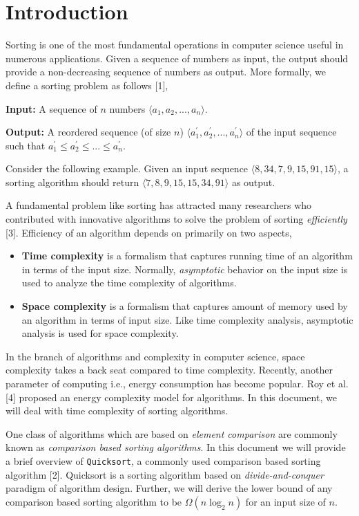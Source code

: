 \documentclass[a4paper, 10pt,twocolumn]{article}
\begin{document}
\section{Introduction}
Sorting is one of the most fundamental operations in computer science useful in numerous applications. Given a sequence of numbers as input, the output should provide a non-decreasing sequence of numbers as output. More formally, we define a sorting problem as follows [1],
\par
\noindent
\textbf{Input:} A sequence of $n$ numbers $ \langle a_1, a_2, ..., a_n \rangle $.
\par
\noindent
\textbf{Output:} A reordered sequence (of size $n$) $ \langle a_{1}^{'}, a_{2}^{'}, ..., a_{n}^{'} \rangle $ of the input sequence such that $ a_{1}^{'} \leq a_{2}^{'} \leq ... \leq a_{n}^{'} $.
\par
\noindent
Consider the following example. Given an input sequence $ \langle 8, 34, 7, 9, 15, 91, 15 \rangle $, a sorting algorithm should return $ \langle 7, 8, 9, 15, 15, 34, 91 \rangle $ as output.
\par
A fundamental problem like sorting has attracted many researchers who contributed with innovative algorithms to solve the problem of sorting \textit{efficiently} [3]. Efficiency of an algorithm depends on primarily on two aspects,
\begin{itemize}
\item \textbf{Time complexity} is a formalism that captures running time of an algorithm in terms of the input size. Normally, \textit{asymptotic} behavior on the input size is used to analyze the time complexity of algorithms.
\item \textbf{Space complexity} is a formalism that captures amount of memory used by an algorithm in terms of input size. Like time complexity analysis, asymptotic analysis is used for space complexity.
\end{itemize}
In the branch of algorithms and complexity in computer science, space complexity takes a back seat compared to time complexity. Recently, another parameter of computing i.e., energy consumption has become popular. Roy et al. [4] proposed an energy complexity model for algorithms. In this document, we will deal with time complexity of sorting algorithms.
\par
One class of algorithms which are based on \textit{element comparison} are commonly known as \textit{comparison based sorting algorithms}. In this document we will provide a brief overview of \texttt{Quicksort}, a commonly used comparison based sorting algorithm [2]. Quicksort is a sorting algorithm based on \textit{divide-and-conquer}
paradigm of algorithm design. Further, we will derive the lower bound of any comparison
based sorting algorithm to be $ \Omega (n \log_2 n)$ for an input size of $n$.
\end{document}
